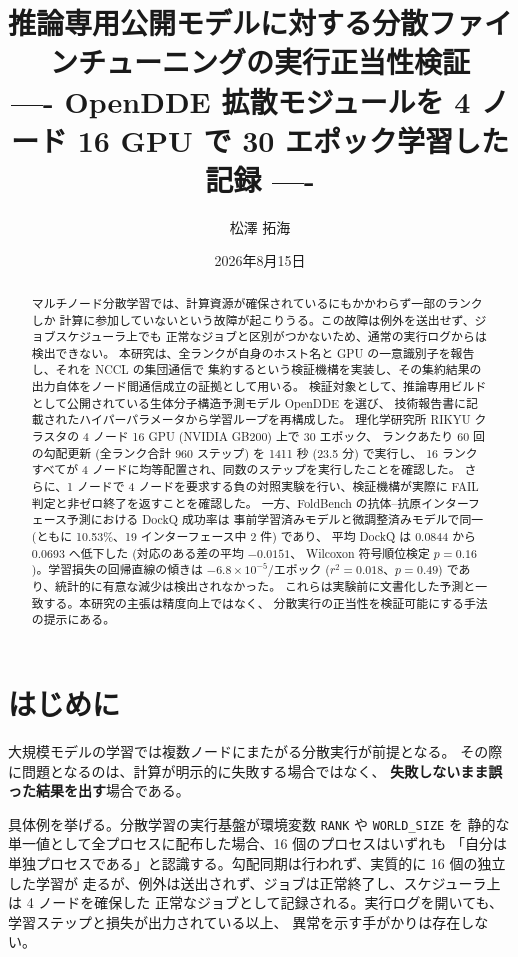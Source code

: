 \documentclass[11pt,a4paper]{article}
\title{推論専用公開モデルに対する分散ファインチューニングの実行正当性検証\\
\large ---- OpenDDE 拡散モジュールを 4 ノード 16 GPU で 30 エポック学習した記録 ----}
\author{松澤 拓海}
\date{2026年8月15日}
\begin{document}
\maketitle

\begin{abstract}
マルチノード分散学習では、計算資源が確保されているにもかかわらず一部のランクしか
計算に参加していないという故障が起こりうる。この故障は例外を送出せず、ジョブスケジューラ上でも
正常なジョブと区別がつかないため、通常の実行ログからは検出できない。
本研究は、全ランクが自身のホスト名と GPU の一意識別子を報告し、それを NCCL の集団通信で
集約するという検証機構を実装し、その集約結果の出力自体をノード間通信成立の証拠として用いる。
検証対象として、推論専用ビルドとして公開されている生体分子構造予測モデル OpenDDE を選び、
技術報告書に記載されたハイパーパラメータから学習ループを再構成した。
理化学研究所 RIKYU クラスタの 4 ノード 16 GPU (NVIDIA GB200) 上で 30 エポック、
ランクあたり 60 回の勾配更新 (全ランク合計 960 ステップ) を 1411 秒 (23.5 分) で実行し、
16 ランクすべてが 4 ノードに均等配置され、同数のステップを実行したことを確認した。
さらに、1 ノードで 4 ノードを要求する負の対照実験を行い、検証機構が実際に
FAIL 判定と非ゼロ終了を返すことを確認した。
一方、FoldBench の抗体--抗原インターフェース予測における DockQ 成功率は
事前学習済みモデルと微調整済みモデルで同一 (ともに 10.53\%、19 インターフェース中 2 件) であり、
平均 DockQ は 0.0844 から 0.0693 へ低下した (対応のある差の平均 $-0.0151$、
Wilcoxon 符号順位検定 $p = 0.16$)。学習損失の回帰直線の傾きは
$-6.8\times10^{-5}$/エポック ($r^2 = 0.018$、$p = 0.49$) であり、統計的に有意な減少は検出されなかった。
これらは実験前に文書化した予測と一致する。本研究の主張は精度向上ではなく、
分散実行の正当性を検証可能にする手法の提示にある。
\end{abstract}

\section{はじめに}

大規模モデルの学習では複数ノードにまたがる分散実行が前提となる。
その際に問題となるのは、計算が明示的に失敗する場合ではなく、
\textbf{失敗しないまま誤った結果を出す}場合である。

具体例を挙げる。分散学習の実行基盤が環境変数 \texttt{RANK} や \texttt{WORLD\_SIZE} を
静的な単一値として全プロセスに配布した場合、16 個のプロセスはいずれも
「自分は単独プロセスである」と認識する。勾配同期は行われず、実質的に 16 個の独立した学習が
走るが、例外は送出されず、ジョブは正常終了し、スケジューラ上は 4 ノードを確保した
正常なジョブとして記録される。実行ログを開いても、学習ステップと損失が出力されている以上、
異常を示す手がかりは存在しない。
\end{document}
